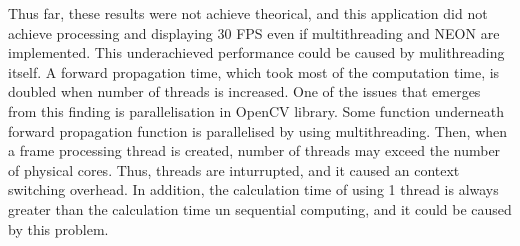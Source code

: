     Thus far, these results were not achieve theorical,
    and this application did not achieve processing and displaying 30 FPS even if
    multithreading and NEON are implemented.
    This underachieved performance could be caused by mulithreading itself.
    A forward propagation time, which took most of the computation time, is doubled when number of threads is increased.
        One of the issues that emerges from this finding is parallelisation in OpenCV library.
        Some function underneath forward propagation function is parallelised by using multithreading.
        Then, when a frame processing thread is created, number of threads may exceed the number of physical cores.
        Thus, threads are inturrupted, and it caused an context switching overhead.
    In addition, the calculation time of using 1 thread is always greater than
    the calculation time un sequential computing, and it could be caused by this problem.